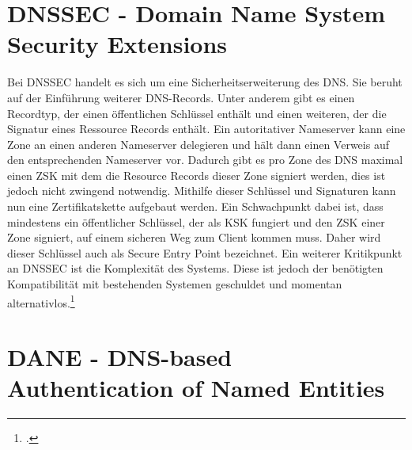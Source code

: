 \section{DNSSEC - Domain Name System Security Extensions}
\label{sec:dnssec}
	Bei \ac{DNSSEC} handelt es sich um eine Sicherheitserweiterung des \ac{DNS}.
	Sie beruht auf der Einführung weiterer \ac{DNS}-Records.
	Unter anderem gibt es einen Recordtyp, der einen öffentlichen Schlüssel enthält und einen weiteren, der die Signatur eines Ressource Records enthält.
	Ein autoritativer Nameserver kann eine Zone an einen anderen Nameserver delegieren und hält dann einen Verweis auf den entsprechenden Nameserver vor.
	Dadurch gibt es pro Zone des \ac{DNS} maximal einen \ac{ZSK} mit dem die Resource Records dieser Zone signiert werden, dies ist jedoch nicht zwingend notwendig.
	Mithilfe dieser Schlüssel und Signaturen kann nun eine Zertifikatskette aufgebaut werden.
	Ein Schwachpunkt dabei ist, dass mindestens ein öffentlicher Schlüssel, der als \ac{KSK} fungiert und den \ac{ZSK} einer Zone signiert, auf einem sicheren Weg zum Client kommen muss.
	Daher wird dieser Schlüssel auch als Secure Entry Point bezeichnet.
	Ein weiterer Kritikpunkt an \ac{DNSSEC} ist die Komplexität des Systems.
	Diese ist jedoch der benötigten Kompatibilität mit bestehenden Systemen geschuldet und momentan alternativlos.\footcite[Vgl.][S. 195]{Sorge2013}

\section{DANE - DNS-based Authentication of Named Entities}
\label{sec:dane}